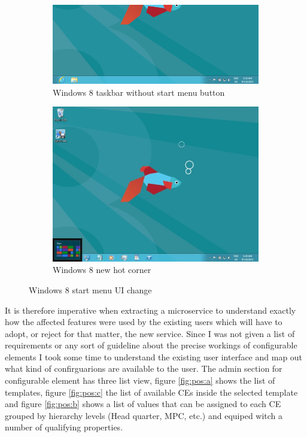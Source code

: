 \begin{figure}
  \begin{subfigure}[b]{0.5\linewidth}
    \includegraphics[width=\linewidth]{assets/windows-8-taskbar.png}
    \caption{Windows 8 taskbar without start menu button}
  \end{subfigure}
  \begin{subfigure}[b]{0.5\linewidth}
    \includegraphics[width=\linewidth]{assets/windows-8-hot-corner.jpg}
    \caption{Windows 8 new hot corner}
  \end{subfigure}
  \caption{Windows 8 start menu UI change}
  \label{fig:win8}
\end{figure}

It is therefore imperative when extracting a microservice to understand exactly how the affected features were used by the existing users which will have to adopt, or reject for that matter, the new service. Since I was not given a list of requirements or any sort of guideline about the precise workings of configurable elements I took some time to understand the existing user interface and map out what kind of confirguarions are available to the user. The admin section for configurable element has three list view, figure \ref{fig:pos:a} shows the list of templates, figure \ref{fig:pos:c} the list of available CEs inside the selected template and figure \ref{fig:pos:b} shows a list of values that can be assigned to each CE grouped by hierarchy levels (Head quarter, MPC, etc.) and equiped witch a number of qualifying properties.

